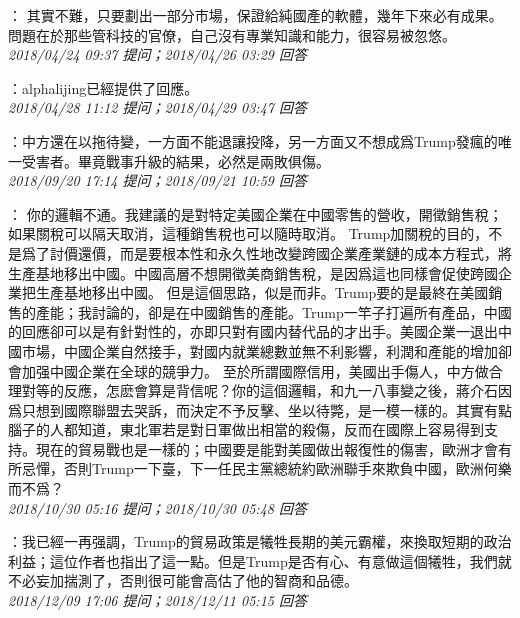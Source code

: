 \documentclass[twocolumn]{ctexart}
\begin{document}
：
其實不難，只要劃出一部分市場，保證給純國產的軟體，幾年下來必有成果。
問題在於那些管科技的官僚，自己沒有專業知識和能力，很容易被忽悠。
\\

\textit{\hfill\noindent\small 2018/04/24 09:37 提问；2018/04/26 03:29 回答}

：alphalijing已經提供了回應。
\\

\textit{\hfill\noindent\small 2018/04/28 11:12 提问；2018/04/29 03:47 回答}

：中方還在以拖待變，一方面不能退讓投降，另一方面又不想成爲Trump發瘋的唯一受害者。畢竟戰事升級的結果，必然是兩敗俱傷。
\\

\textit{\hfill\noindent\small 2018/09/20 17:14 提问；2018/09/21 10:59 回答}

：
你的邏輯不通。我建議的是對特定美國企業在中國零售的營收，開徵銷售稅；如果關稅可以隔天取消，這種銷售稅也可以隨時取消。
Trump加關稅的目的，不是爲了討價還價，而是要根本性和永久性地改變跨國企業產業鏈的成本方程式，將生產基地移出中國。中國高層不想開徵美商銷售稅，是因爲這也同樣會促使跨國企業把生產基地移出中國。
但是這個思路，似是而非。Trump要的是最終在美國銷售的產能；我討論的，卻是在中國銷售的產能。Trump一竿子打遍所有產品，中國的回應卻可以是有針對性的，亦即只對有國内替代品的才出手。美國企業一退出中國市場，中國企業自然接手，對國内就業總數並無不利影響，利潤和產能的增加卻會加强中國企業在全球的競爭力。
至於所謂國際信用，美國出手傷人，中方做合理對等的反應，怎麽會算是背信呢？你的這個邏輯，和九一八事變之後，蔣介石因爲只想到國際聯盟去哭訴，而決定不予反擊、坐以待斃，是一模一樣的。其實有點腦子的人都知道，東北軍若是對日軍做出相當的殺傷，反而在國際上容易得到支持。現在的貿易戰也是一樣的；中國要是能對美國做出報復性的傷害，歐洲才會有所忌憚，否則Trump一下臺，下一任民主黨總統約歐洲聯手來欺負中國，歐洲何樂而不爲？
\\

\textit{\hfill\noindent\small 2018/10/30 05:16 提问；2018/10/30 05:48 回答}

：我已經一再强調，Trump的貿易政策是犧牲長期的美元霸權，來換取短期的政治利益；這位作者也指出了這一點。但是Trump是否有心、有意做這個犧牲，我們就不必妄加揣測了，否則很可能會高估了他的智商和品德。
\\

\textit{\hfill\noindent\small 2018/12/09 17:06 提问；2018/12/11 05:15 回答}
\end{document}
